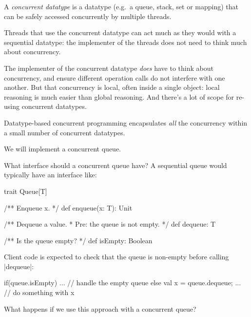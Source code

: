 \begin{slide}

A \emph{concurrent datatype} is a datatype (e.g.~a queue, stack, set or
mapping) that can be safely accessed concurrently by multiple threads.  

Threads that use the concurrent datatype can act much as they would with a
sequential datatype: the implementer of the threads does not need to think
much about concurrency.  

The implementer of the concurrent datatype \emph{does} have to think about
concurrency, and ensure different operation calls do not interfere with one
another.  But that concurrency is local, often inside a single object: local
reasoning is much easier than global reasoning.  And there's a lot of scope
for re-using concurrent datatypes.

Datatype-based concurrent programming encapsulates \emph{all} the concurrency
within a small number of concurrent datatypes.
\end{slide}


\begin{slide}

We will implement a concurrent queue.

What interface should a concurrent queue have?  A sequential queue would
typically have an interface like:

\begin{scala}
trait Queue[T]{
  /** Enqueue x. */
  def enqueue(x: T): Unit

  /** Dequeue a value.  
    * Pre: the queue is not empty. */
  def dequeue: T

  /** Is the queue empty? */
  def isEmpty: Boolean
}
\end{scala}
\end{slide}


\begin{slide}

Client code is expected to check that the queue is non-empty before calling
|dequeue|:
\begin{scala}
  if(queue.isEmpty){ 
    ... // handle the empty queue
  } 
  else{ 
    val x = queue.dequeue; ... // do something with x
  }
\end{scala}

What happens if we use this approach  with a concurrent queue?
\end{slide} 

